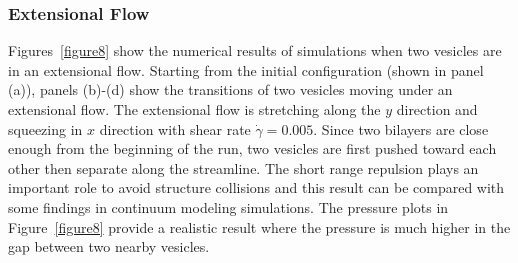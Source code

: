 \documentclass[lineno]{jfm}
\begin{document}




\subsubsection{Extensional Flow}

Figures~\ref{figure8} show the numerical results of simulations when two vesicles are in an extensional flow. Starting from the initial configuration (shown in panel (a)), panels (b)-(d) show the transitions of two vesicles moving under an extensional flow. The extensional flow is stretching along the $y$ direction and squeezing in $x$ direction with shear rate $\dot\gamma=0.005$. Since two bilayers are close enough
from the beginning of the run, two vesicles are first pushed toward each other then separate along the streamline. The short range repulsion plays an important role to avoid structure collisions and 
this result can be compared with some findings in continuum modeling simulations.
The pressure plots in Figure~\ref{figure8} provide a realistic result where the pressure is much higher in the gap between two nearby vesicles.

\end{document}
